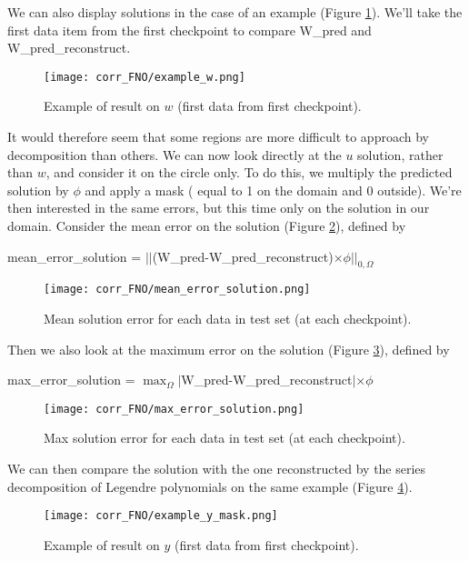 We can also display solutions in the case of an example (Figure \ref{example_w}). We'll take the first data item from the first checkpoint to compare W\_pred and W\_pred\_reconstruct.

\begin{figure}[H]
	\centering
	\texttt{[image: corr\_FNO/example\_w.png]}
	\caption{Example of result on $w$ (first data from first checkpoint).}
	\label{example_w}
\end{figure} 

It would therefore seem that some regions are more difficult to approach by decomposition than others. We can now look directly at the $u$ solution, rather than $w$, and consider it on the circle only. To do this, we multiply the predicted solution by $\phi$ and apply a mask ( equal to 1 on the domain and 0 outside). We're then interested in the same errors, but this time only on the solution in our domain. Consider the mean error on the solution (Figure \ref{mean_error_solution}), defined by
\begin{center}
	mean\_error\_solution = $||$(W\_pred-W\_pred\_reconstruct)$\times\phi||_{0,\Omega}$
\end{center}

\begin{figure}[H]
	\centering
	\texttt{[image: corr\_FNO/mean\_error\_solution.png]}
	\caption{Mean solution error for each data in test set (at each checkpoint).}
	\label{mean_error_solution}
\end{figure} 

Then we also look at the maximum error on the solution (Figure \ref{max_error_solution}), defined by
\begin{center}
	max\_error\_solution = $\max_\Omega|$W\_pred-W\_pred\_reconstruct$|\times\phi$
\end{center}

\begin{figure}[H]
	\centering
	\texttt{[image: corr\_FNO/max\_error\_solution.png]}
	\caption{Max solution error for each data in test set (at each checkpoint).}
	\label{max_error_solution}
\end{figure} 

We can then compare the solution with the one reconstructed by the series decomposition of Legendre polynomials on the same example (Figure \ref{example_y_mask}).
\begin{figure}[H]
	\centering
	\texttt{[image: corr\_FNO/example\_y\_mask.png]}
	\caption{Example of result on $y$ (first data from first checkpoint).}
	\label{example_y_mask}
\end{figure} 

